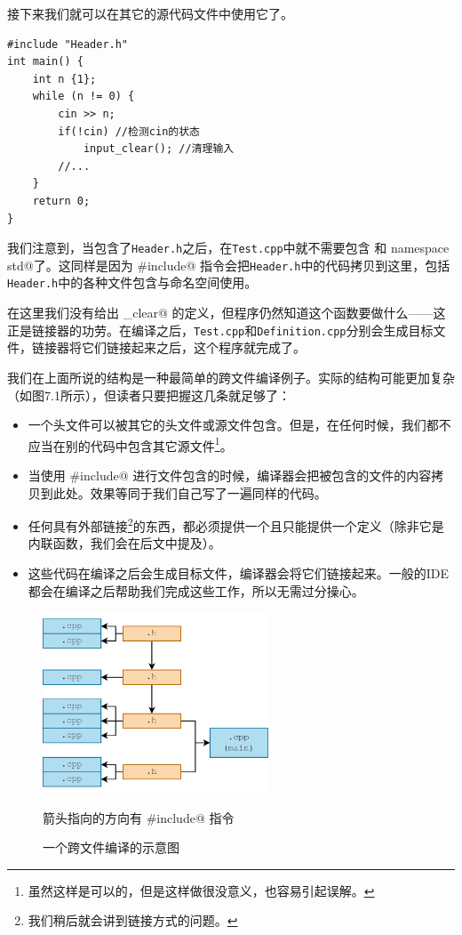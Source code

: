 接下来我们就可以在其它的源代码文件中使用它了。
\begin{lstlisting}[caption=\texttt{Test.cpp}]
#include "Header.h"
int main() {
    int n {1};
    while (n != 0) {
        cin >> n;
        if(!cin) //检测cin的状态
            input_clear(); //清理输入
        //...
    }
    return 0;
}
\end{lstlisting}
我们注意到，当包含了\texttt{Header.h}之后，在\texttt{Test.cpp}中就不需要包含 \lstinline@iostream@ 和 \lstinline@using namespace std@了。这同样是因为 \lstinline@#include@ 指令会把\texttt{Header.h}中的代码拷贝到这里，包括\texttt{Header.h}中的各种文件包含与命名空间使用。\par
在这里我们没有给出 \lstinline@input_clear@ 的定义，但程序仍然知道这个函数要做什么——这正是链接器的功劳。在编译之后，\texttt{Test.cpp}和\texttt{Definition.cpp}分别会生成目标文件，链接器将它们链接起来之后，这个程序就完成了。\par
我们在上面所说的结构是一种最简单的跨文件编译例子。实际的结构可能更加复杂（如图7.1所示），但读者只要把握这几条就足够了：
\begin{itemize}
    \item 一个头文件可以被其它的头文件或源文件包含。但是，在任何时候，我们都不应当在别的代码中包含其它源文件\footnote{虽然这样是可以的，但是这样做很没意义，也容易引起误解。}。
    \item 当使用 \lstinline@#include@ 进行文件包含的时候，编译器会把被包含的文件的内容拷贝到此处。效果等同于我们自己写了一遍同样的代码。
    \item 任何具有外部链接\footnote{我们稍后就会讲到链接方式的问题。}的东西，都必须提供一个且只能提供一个定义（除非它是内联函数，我们会在后文中提及）。
    \item 这些代码在编译之后会生成目标文件，编译器会将它们链接起来。一般的IDE都会在编译之后帮助我们完成这些工作，所以无需过分操心。
\end{itemize}
\begin{figure}[htbp]
    \centering
    \includegraphics[width=0.6\textwidth]{../images/generalized_parts/07_separate_compilation_300.png}
    \caption{一个跨文件编译的示意图}
    \footnotesize{箭头指向的方向有 \lstinline@#include@ 指令}
\end{figure}
